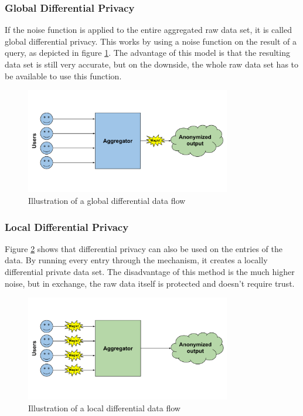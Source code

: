 \subsubsection{Global Differential Privacy}

If the noise function is applied to the entire aggregated raw data set, it is called global differential privacy. This works by using a noise function on the result of a query, as depicted in figure \ref{fig:global_diff}. The advantage of this model is that the resulting data set is still very accurate, but on the downside, the whole raw data set has to be available to use this function.

\begin{figure}[htpb]
  \centering
  \includegraphics[width=0.8\textwidth]{figures/global_diff.png}
  \caption{Illustration of a global differential data flow} \label{fig:global_diff}
\end{figure}

\subsubsection{Local Differential Privacy}
Figure \ref{fig:local_diff} shows that differential privacy can also be used on the entries of the data. By running every entry through the mechanism, it creates a locally differential private data set. The disadvantage of this method is the much higher noise, but in exchange, the raw data itself is protected and doesn't require trust.

\begin{figure}[htpb]
  \centering
  \includegraphics[width=0.8\textwidth]{figures/local_diff.png}
  \caption{Illustration of a local differential data flow} \label{fig:local_diff}
\end{figure}

